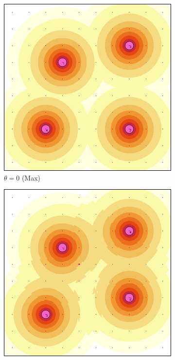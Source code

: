 \documentclass[letterpaper, 10 pt, conference]{ieeeconf}
\begin{document}
\begin{figure}[!h]
    \centering
    \begin{subfigure}[t]{0.4\columnwidth}
        \centering
        \includegraphics[width=\columnwidth]{Figures/DetFun_0.png}
        \caption{$\theta = 0$ (Max)}
    \end{subfigure}%
    \hfill
    \begin{subfigure}[t]{0.4\columnwidth}
        \centering
        \includegraphics[width=\columnwidth]{Figures/DetFun_30.png}

\end{subfigure}
\end{figure}
\end{document}
